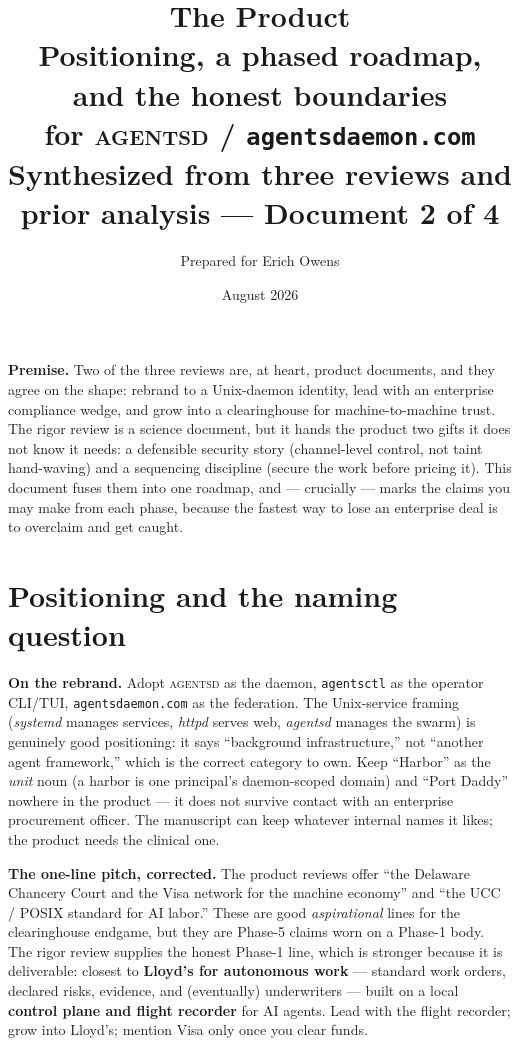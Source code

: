\documentclass[11pt,a4paper]{article}
\title{\textbf{The Product}\\[4pt]
\large Positioning, a phased roadmap, and the honest boundaries\\ for \textsc{agentsd} / \texttt{agentsdaemon.com}\\[3pt]
\normalsize Synthesized from three reviews and prior analysis --- Document 2 of 4}
\author{Prepared for Erich Owens}
\date{August 2026}
\begin{document}
\maketitle

\noindent\textbf{Premise.} Two of the three reviews are, at heart, product documents, and they agree on the shape: rebrand to a Unix-daemon identity, lead with an enterprise compliance wedge, and grow into a clearinghouse for machine-to-machine trust. The rigor review is a science document, but it hands the product two gifts it does not know it needs: a defensible security story (channel-level control, not taint hand-waving) and a sequencing discipline (secure the work before pricing it). This document fuses them into one roadmap, and --- crucially --- marks the claims you may make from each phase, because the fastest way to lose an enterprise deal is to overclaim and get caught.

\section{Positioning and the naming question}
\begin{verdict}\textbf{On the rebrand.} Adopt \textsc{agentsd} as the daemon, \texttt{agentsctl} as the operator CLI/TUI, \texttt{agentsdaemon.com} as the federation. The Unix-service framing (\emph{systemd} manages services, \emph{httpd} serves web, \emph{agentsd} manages the swarm) is genuinely good positioning: it says ``background infrastructure,'' not ``another agent framework,'' which is the correct category to own. Keep ``Harbor'' as the \emph{unit} noun (a harbor is one principal's daemon-scoped domain) and ``Port Daddy'' nowhere in the product --- it does not survive contact with an enterprise procurement officer. The manuscript can keep whatever internal names it likes; the product needs the clinical one.\end{verdict}

\noindent\textbf{The one-line pitch, corrected.} The product reviews offer ``the Delaware Chancery Court and the Visa network for the machine economy'' and ``the UCC / POSIX standard for AI labor.'' These are good \emph{aspirational} lines for the clearinghouse endgame, but they are Phase-5 claims worn on a Phase-1 body. The rigor review supplies the honest Phase-1 line, which is stronger because it is deliverable: closest to \textbf{Lloyd's for autonomous work} --- standard work orders, declared risks, evidence, and (eventually) underwriters --- built on a local \textbf{control plane and flight recorder} for AI agents. Lead with the flight recorder; grow into Lloyd's; mention Visa only once you clear funds.
\end{document}

